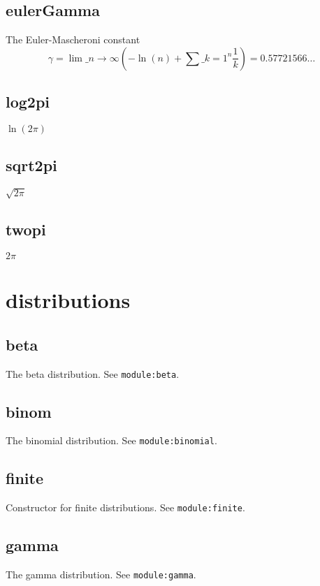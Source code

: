 \documentclass{article}
\begin{document}
    \subsection*{eulerGamma}
    The Euler-Mascheroni constant
\[\gamma = \lim \_ {n \to \infty} \left(-\ln(n) + \sum \_ {k=1}^n \frac{1}{k}\right) = 0.57721566 \ldots\]


    \subsection*{log2pi}
    $\ln(2\pi)$


    \subsection*{sqrt2pi}
    $\sqrt{2\pi}$


    \subsection*{twopi}
    $2\pi$


  \section{distributions}
    \subsection*{beta}
    The beta distribution. See \texttt{module:beta}.


    \subsection*{binom}
    The binomial distribution. See \texttt{module:binomial}.


    \subsection*{finite}
    Constructor for finite distributions. See \texttt{module:finite}.


    \subsection*{gamma}
    The gamma distribution. See \texttt{module:gamma}.
\end{document}
